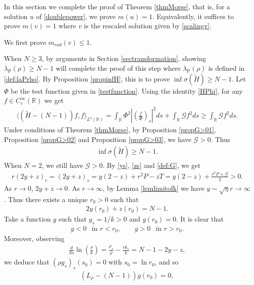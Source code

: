 \documentclass{article}
\theoremstyle{definition} \theoremstyle{remark}
\numberwithin{equation}{section}
\newcommand{\R}{\mathbb{R}}
\newcommand{\la}{\lambda}
\newcommand{\G}{\mathcal{G}}
\begin{document}
	In this section we complete the proof of Theorem \ref{thmMorse}, that is, for a solution $u$ of \eqref{doublepower}, we prove $m(u) = 1$. Equivalently, it suffices to prove $m(v) = 1$ where $v$ is the rescaled solution given by \eqref{scalingv}.

	We first prove $m_{rad}(v) \le 1$.
	
	When $N \ge 3$, by arguments in Section \ref{sectransformation}, showing $\la_{\text{P}}(\rho) \ge N-1$ will complete the proof of this step where $\la_{\text{P}}(\rho)$ is defined in \eqref{def:laPrho}. By Proposition \ref{propinfH}, this is to prove $\inf \sigma(\widetilde{H}) \ge N-1$. Let $\Phi$ be the test function given in \eqref{testfunction}. Using the identity \eqref{HPhi}, for any $f \in C_c^\infty(\R)$ we get
	\begin{align*}
		\big\langle (\widetilde{H}- (N-1))f,f\big\rangle_{L^2(\R)} = \int_{\R}\Phi^2\left|\left(\frac{f}{\Phi}\right)_s\right|^2 ds + \int_{\R}\G f^2 ds \ge \int_{\R}\G f^2 ds.
	\end{align*}
	Under conditions of Theorem \ref{thmMorse}, by Proposition \ref{propG>01}, Proposition \ref{propG>02} and Proposition \ref{propG>03}, we have $\G > 0$. Thus
	\begin{align*}
		\inf \sigma(\widetilde{H}) \ge N-1.
	\end{align*}
When $N = 2$, we still have $\G > 0$. By \eqref{ys}, \eqref{zs} and \eqref{def:G}, we get
	\begin{align*}
		r(2y+z)_r = (2y + z)_s = y(2-z) + r^2P - zT = y(2-z) + \frac{r^2P + \G}{2} > 0.
	\end{align*}
	As $r \to 0$, $2y + z \to 0$. As $r \to \infty$, by Lemma \ref{lemlimitofk} we have $y \sim \sqrt{\eta}r \to \infty$. Thus there exists a unique $r_0 > 0$ such that
	\begin{align*}
		2y(r_0) + z(r_0) = N-1.
	\end{align*}
	Take a function $g$ such that $g_s = 1/k > 0$ and $g(r_0) = 0$. It is clear that
	\begin{align*}
		g < 0 ~~ \text{ in } r < r_0, \quad\quad g > 0 ~~ \text{ in } r > r_0.
	\end{align*}
	Moreover, observing
	\begin{align*}
		\frac{d}{ds}\ln \left(\frac{\rho}{k}\right) = \frac{\rho_s}{\rho} - \frac{rk_r}{k} = N-1 -2y - z,
	\end{align*}
	we deduce that $(\rho g_s)_s(s_0) = 0$ with $s_0 = \ln r_0$, and so
	\begin{align*}
		\left(L_\rho - (N-1)\right)g(r_0) = 0,
	\end{align*}
\end{document}
